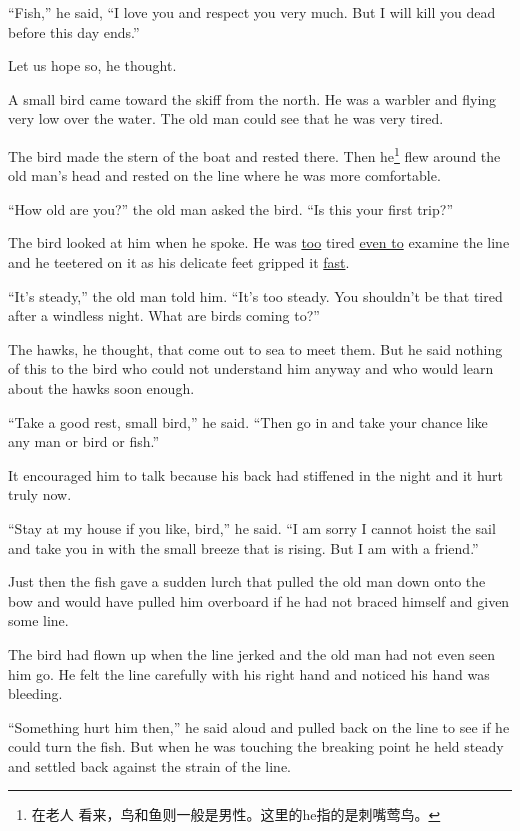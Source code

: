 ``Fish,'' he said, ``I love you and respect you very much. But I will kill
you dead before this day ends.''

Let us hope so, he thought.

A small bird came toward the skiff from the north. He was a \gls{warbler} and
flying very low over the water. The old man could see that he was very
tired.

The bird made the stern of the boat and rested there. Then he\footnote{在老人
  看来，鸟和鱼则一般是男性。这里的he指的是刺嘴莺鸟。} flew around the old man's head and rested on
the line where he was more comfortable.

``How old are you?'' the old man asked the bird. ``Is this your first trip?''

The bird looked at him when he spoke. He was \uline{too} tired \uline{even
  to} examine the line and he \gls{teetered} on it as his delicate feet
\gls{gripped} it \uline{fast}.

``It's steady,'' the old man told him. ``It's too steady. You shouldn't be
that tired after a windless night. What are birds coming to?''

The \glspl{hawk}, he thought, that come out to sea to meet them. But he said
nothing of this to the bird who could not understand him anyway and who
would learn about the hawks soon enough.

``Take a good rest, small bird,'' he said. ``Then go in and take your chance
like any man or bird or fish.''

It \gls{encouraged} him to talk because his back had \gls{stiffened} in the
night and it hurt truly now.

``Stay at my house if you like, bird,'' he said. ``I am sorry I cannot
\gls{hoist} the sail and take you in with the small breeze that is rising.
But I am with a friend.''

Just then the fish gave a sudden lurch that pulled the old man down onto the
bow and would have pulled him \gls{overboard} if he had not braced himself and
given some line.

The bird had flown up when the line jerked and the old man had not even seen
him go. He felt the line carefully with his right hand and \gls{noticed} his
hand was bleeding.

``Something hurt him then,'' he said aloud and pulled back on the line to
see if he could turn the fish. But when he was touching the breaking point
he held steady and settled back against the strain of the line.

